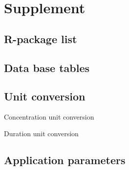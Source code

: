 \section*{Supplement}
\subsection*{R-package list} %
\label{list:r-packages}

\pagebreak

\subsection*{Data base tables}


\subsection*{Unit conversion}

\begin{table}
    \caption{Concentration unit conversion}
    \label{tab:conv-concentration}
\end{table}

\begin{table}
    \caption{Duration unit conversion}
    \label{tab:conv-duration}
\end{table}

\subsection*{Application parameters}











